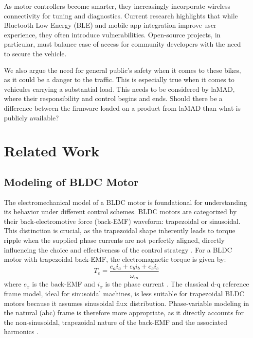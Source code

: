 \documentclass[conference]{IEEEtran}
\begin{document}
As motor controllers become smarter, they increasingly incorporate wireless connectivity for tuning and diagnostics. 
Current research highlights that while Bluetooth Low Energy (BLE) and mobile app integration improve user experience, 
they often introduce vulnerabilities. Open-source projects, in particular, must balance ease of access for community 
developers with the need to secure the vehicle.

We also argue the need for general public's safety when it comes to these bikes, as it could be a danger to the traffic.
 This is especially true when it comes to vehicules carrying a substantial load. This needs to be considered by laMAD, 
 where their responsibility and control begins and ends. Should there be a difference between the firmware loaded on a 
 product from laMAD than what is publicly available? 


\section{Related Work}

\subsection{Modeling of BLDC Motor}
The electromechanical model of a BLDC motor is foundational for understanding its behavior under different control 
schemes. BLDC motors are categorized by their back-electromotive force (back-EMF) waveform: trapezoidal or sinusoidal. 
This distinction is crucial, as the trapezoidal shape inherently leads to torque ripple when the supplied phase currents 
are not perfectly aligned, directly influencing the choice and effectiveness of the control strategy 
\cite{patil_analysis_2025}. For a BLDC motor with trapezoidal back-EMF, the electromagnetic torque is given by:
\[
T_e = \frac{e_a i_a + e_b i_b + e_c i_c}{\omega_m}
\]
where \( e_x \) is the back-EMF and \( i_x \) is the phase current \cite{li_quantitative_2019}. The classical d-q 
reference frame model, ideal for sinusoidal machines, is less suitable for trapezoidal BLDC motors because it assumes 
sinusoidal flux distribution. Phase-variable modeling in the natural (abc) frame is therefore more appropriate, as it 
directly accounts for the non-sinusoidal, trapezoidal nature of the back-EMF and the associated harmonics 
\cite{mohammd_taher_new_2021}.
\end{document}
